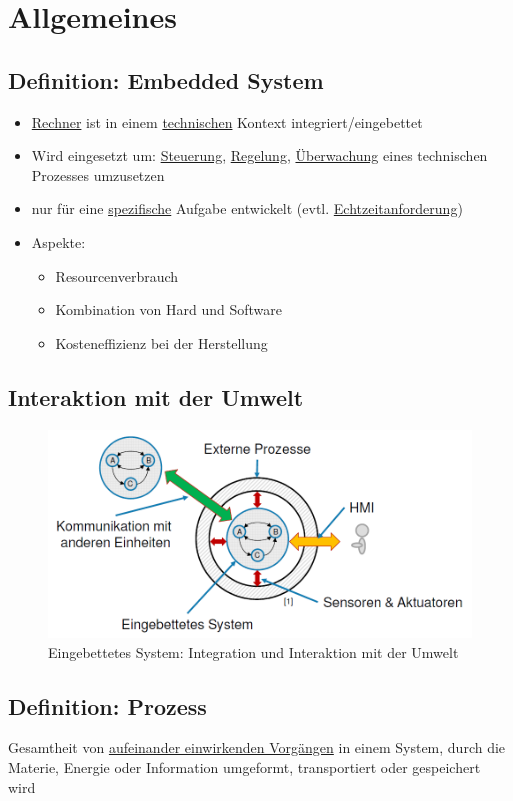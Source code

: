 \section{Allgemeines}

\subsection{Definition: Embedded System}
\begin{itemize}
	
	\item \underline{Rechner} ist in einem \underline{technischen} Kontext integriert/eingebettet
	
	\item Wird eingesetzt um: \underline{Steuerung}, \underline{Regelung}, \underline{Überwachung} eines technischen Prozesses umzusetzen

	\item nur für eine \underline{spezifische} Aufgabe entwickelt (evtl. \underline{Echtzeitanforderung})
	
	\item Aspekte:
	\begin{itemize}
		\item Resourcenverbrauch
		\item Kombination von Hard und Software
		\item Kosteneffizienz bei der Herstellung
	\end{itemize}
	
\end{itemize}

\subsection{Interaktion mit der Umwelt}
\begin{figure}[h!]
	\begin{center}
		\includegraphics[width=.5\linewidth]{pics/interaktion}
		\caption{Eingebettetes System: Integration und Interaktion mit der Umwelt}
	\end{center}
\end{figure}

\subsection{Definition: Prozess}
Gesamtheit von \underline{aufeinander einwirkenden Vorgängen} in einem System, 
durch die Materie, Energie oder Information umgeformt, transportiert oder gespeichert wird

